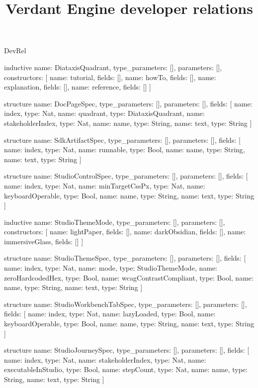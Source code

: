\begin{lexlean}{DevRel}
\title{Verdant Engine developer relations}
\begin{semanticmodule}
inductive{
  name: DiataxisQuadrant,
  type_parameters: [],
  parameters: [],
  constructors: [
    {name: tutorial, fields: []},
    {name: howTo, fields: []},
    {name: explanation, fields: []},
    {name: reference, fields: []}
  ]
}

structure{
  name: DocPageSpec,
  type_parameters: [],
  parameters: [],
  fields: [
    {name: index, type: Nat},
    {name: quadrant, type: DiataxisQuadrant},
    {name: stakeholderIndex, type: Nat},
    {name: name, type: String},
    {name: text, type: String}
  ]
}

structure{
  name: SdkArtifactSpec,
  type_parameters: [],
  parameters: [],
  fields: [
    {name: index, type: Nat},
    {name: runnable, type: Bool},
    {name: name, type: String},
    {name: text, type: String}
  ]
}

structure{
  name: StudioControlSpec,
  type_parameters: [],
  parameters: [],
  fields: [
    {name: index, type: Nat},
    {name: minTargetCssPx, type: Nat},
    {name: keyboardOperable, type: Bool},
    {name: name, type: String},
    {name: text, type: String}
  ]
}

inductive{
  name: StudioThemeMode,
  type_parameters: [],
  parameters: [],
  constructors: [
    {name: lightPaper, fields: []},
    {name: darkObsidian, fields: []},
    {name: immersiveGlass, fields: []}
  ]
}

structure{
  name: StudioThemeSpec,
  type_parameters: [],
  parameters: [],
  fields: [
    {name: index, type: Nat},
    {name: mode, type: StudioThemeMode},
    {name: zeroHardcodedHex, type: Bool},
    {name: wcagContrastCompliant, type: Bool},
    {name: name, type: String},
    {name: text, type: String}
  ]
}

structure{
  name: StudioWorkbenchTabSpec,
  type_parameters: [],
  parameters: [],
  fields: [
    {name: index, type: Nat},
    {name: lazyLoaded, type: Bool},
    {name: keyboardOperable, type: Bool},
    {name: name, type: String},
    {name: text, type: String}
  ]
}

structure{
  name: StudioJourneySpec,
  type_parameters: [],
  parameters: [],
  fields: [
    {name: index, type: Nat},
    {name: stakeholderIndex, type: Nat},
    {name: executableInStudio, type: Bool},
    {name: stepCount, type: Nat},
    {name: name, type: String},
    {name: text, type: String}
  ]
}


\end{semanticmodule}
\end{lexlean}
